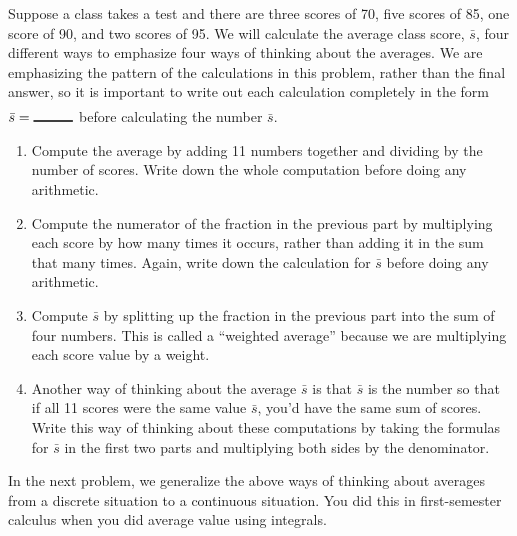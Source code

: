 \begin{problem}\label{average value methods}
  Suppose a class takes a test and there are three scores of 70, five scores of 85, one score of 90, and two scores of 95.  We will calculate the average class score, $\bar s$, four different ways to emphasize four ways of thinking about the averages.  We are emphasizing the pattern of the calculations in this problem, rather than the final answer, so it is important to write out each calculation completely in the form $\bar s = \blank{1cm}$ before calculating the number $\bar s$.
  \begin{enumerate}
  \item {}%
 Compute the average by adding 11 numbers together and dividing by the number of scores.  Write down the whole computation before doing any arithmetic.
  \item {}%
Compute the numerator of the fraction in the previous part by multiplying each score by how many times it occurs, rather than adding it in the sum that many times.  Again, write down the calculation for $\bar s$ before doing any arithmetic.
  \item {}%
Compute $\bar s$ by splitting up the fraction in the previous part into the sum of four numbers.  This is called a ``weighted average'' because we are multiplying each score value by a weight.
  \item {}%
Another way of thinking about the average $\bar s$ is that $\bar s$ is the number so that if all 11 scores were the same value $\bar s$, you'd have the same sum of scores.  Write this way of thinking about these computations by taking the formulas for $\bar s$ in the first two parts and multiplying both sides by the denominator.
  \end{enumerate}
\end{problem}

In the next problem, we generalize the above ways of thinking about averages from a discrete situation to a continuous situation.  You did this in first-semester calculus when you did average value using integrals.

